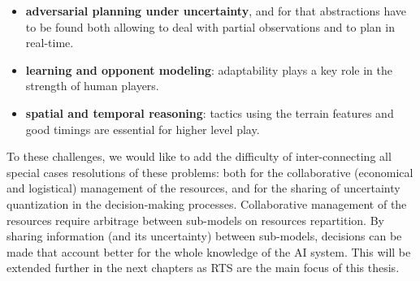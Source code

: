 

\begin{itemize}
    \item \textbf{adversarial planning under uncertainty}, and for that abstractions have to be found both allowing to deal with partial observations and to plan in real-time.
    \item \textbf{learning and opponent modeling}: adaptability plays a key role in the strength of human players.
    \item \textbf{spatial and temporal reasoning}: tactics using the terrain features and good timings are essential for higher level play.
\end{itemize}
To these challenges, we would like to add the difficulty of inter-connecting all special cases resolutions of these problems: both for the collaborative (economical and logistical) management of the resources, and for the sharing of uncertainty quantization in the decision-making processes. Collaborative management of the resources require arbitrage between sub-models on resources repartition. By sharing information (and its uncertainty) between sub-models, decisions can be made that account better for the whole knowledge of the AI system. This will be extended further in the next chapters as RTS are the main focus of this thesis.

